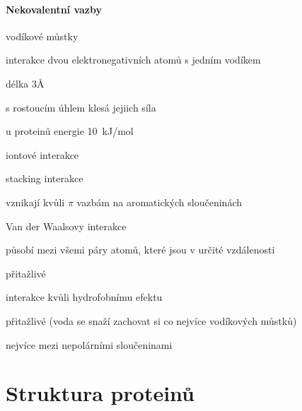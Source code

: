 \documentclass[DIV=8]{scrreprt}
\begin{document}
\paragraph{Nekovalentní vazby}
\begin{myItemize}[nosep]
    \item vodíkové můstky
\begin{myItemize}[nosep]
    \item interakce dvou elektronegativních atomů s jedním vodíkem
    \item délka 3Å
    \item s rostoucím úhlem klesá jejiich síla
    \item u proteinů energie \si{10 kJ/mol}
\end{myItemize}

    \item iontové interakce
    \item stacking interakce
\begin{myItemize}[nosep]
    \item vznikají kvůli \(\pi\) vazbám na aromatických sloučeninách
\end{myItemize}

    \item Van der Waalsovy interakce
\begin{myItemize}[nosep]
    \item působí mezi všemi páry atomů, které jsou v určité vzdálenosti
    \item přitažlivé
\end{myItemize}

    \item interakce kvůli hydrofobnímu efektu
\begin{myItemize}[nosep]
    \item přitažlivé (voda se snaží zachovat si co nejvíce vodíkových můstků)
    \item nejvíce mezi nepolárními sloučeninami
\end{myItemize}

\end{myItemize}



\section{Struktura proteinů} \label{Struktura proteinů} \FloatBarrier


\end{document}

